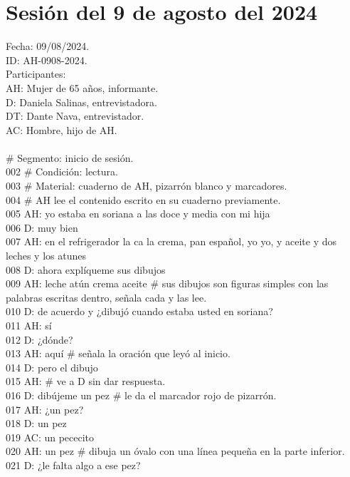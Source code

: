 \section{Sesión del 9 de agosto del 2024}

\noindent
Fecha: 09/08/2024.\\
ID: AH-0908-2024.\\
Participantes:\\
AH: Mujer de 65 años, informante.\\
D: Daniela Salinas, entrevistadora. \\
DT: Dante Nava, entrevistador.\\
AC: Hombre, hijo de AH.\\
\\
 \# Segmento: inicio de sesión.\\
002 \# Condición: lectura.\\
003 \# Material: cuaderno de AH, pizarrón blanco y marcadores.\\
004 \# AH lee el contenido escrito en su cuaderno previamente.\\
005 AH: yo estaba en soriana a las doce y media con mi hija\\
006 D: muy bien\\
007 AH: en el refrigerador la ca la crema, pan español, yo yo, y aceite y dos leches y los atunes\\
008 D: ahora explíqueme sus dibujos\\
009 AH: leche atún crema aceite \# sus dibujos son figuras simples con las palabras escritas dentro, señala cada y las lee.\\
010 D: de acuerdo y ¿dibujó cuando estaba usted en soriana?\\
011 AH: sí\\
012 D: ¿dónde?\\
013 AH: aquí \# señala la oración que leyó al inicio.\\
014 D: pero el dibujo\\
015 AH: \# ve a D sin dar respuesta.\\
016 D: dibújeme un pez \# le da el marcador rojo de pizarrón.\\
017 AH: ¿un pez?\\
018 D: un pez\\
019 AC: un pececito\\
020 AH: un pez \# dibuja un óvalo con una línea pequeña en la parte inferior.\\
021 D: ¿le falta algo a ese pez?\\
